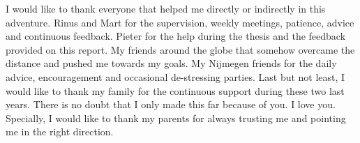 \begin{center}
I would like to thank everyone that helped me directly or indirectly in this adventure. Rinus and Mart for the supervision, weekly meetings, patience, advice and continuous feedback. Pieter for the help during the thesis and the feedback provided on this report. My friends around the globe that somehow overcame the distance and pushed me towards my goals. My Nijmegen friends for the daily advice, encouragement and occasional de-stressing parties. Last but not least, I would like to thank my family for the continuous support during these two last years. There is no doubt that I only made this far because of you. I love you. Specially, I would like to thank my parents for always trusting me and pointing me in the right direction. 
\end{center}

